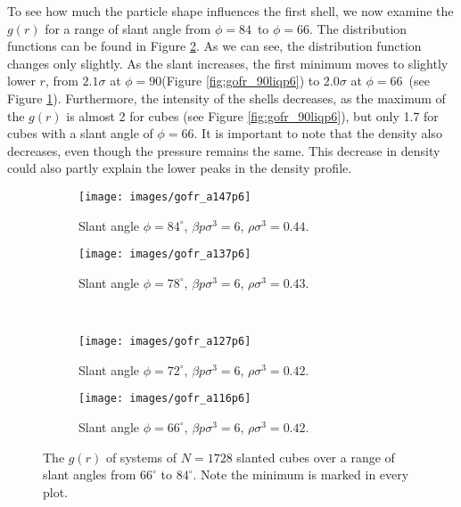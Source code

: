 \documentclass[thesis]{subfiles}
\begin{document}
To see how much the particle shape influences the first shell, we now examine the $g(r)$ for a range of slant angle from $\phi = 84$\degr\ to $\phi = 66$\degr. The distribution functions can be found in Figure \ref{fig:gofr_non90liq}. As we can see, the distribution function changes only slightly. As the slant increases, the first minimum moves to slightly lower $r$, from $2.1\sigma$ at $\phi = 90$\degr (Figure \ref{fig:gofr_90liqp6}) to $2.0\sigma$ at $\phi = 66$\degr\ (see Figure \ref{fig:gofr_non90liqa66}). Furthermore, the intensity of the shells decreases, as the maximum of the $g(r)$ is almost 2 for cubes (see Figure \ref{fig:gofr_90liqp6}), but only 1.7 for cubes with a slant angle of $\phi = 66$\degr. It is important to note that the density also decreases, even though the pressure remains the same. This decrease in density could also partly explain the lower peaks in the density profile.

\begin{figure}[H]
	\centering
	\begin{subfigure}{0.49\textwidth}
		\texttt{[image: images/gofr\_a147p6]}
		\caption{Slant angle $\phi = 84^\circ$, $\beta p \sigma^3 = 6$, $\rho \sigma^3 = 0.44$. }
	\end{subfigure}
	\begin{subfigure}{0.49\textwidth}
		\texttt{[image: images/gofr\_a137p6]}
		\caption{Slant angle $\phi = 78^\circ$, $\beta p \sigma^3 = 6$, $\rho \sigma^3 = 0.43$. }
	\end{subfigure}
	\\
	\vspace{10pt}
	\begin{subfigure}{0.49\textwidth}
		\texttt{[image: images/gofr\_a127p6]}
		\caption{Slant angle $\phi = 72^\circ$, $\beta p \sigma^3 = 6$, $\rho \sigma^3 = 0.42$. }
	\end{subfigure}
	\begin{subfigure}{0.49\textwidth}
		\texttt{[image: images/gofr\_a116p6]}
		\caption{Slant angle $\phi = 66^\circ$, $\beta p \sigma^3 = 6$, $\rho \sigma^3 = 0.42$. }\label{fig:gofr_non90liqa66}
	\end{subfigure}
	
	\caption{The $g(r)$ of systems of $N = 1728$ slanted cubes over a range of slant angles from $66^\circ$ to $84^\circ$. Note the minimum is marked in every plot.}\label{fig:gofr_non90liq}
\end{figure}
\end{document}
